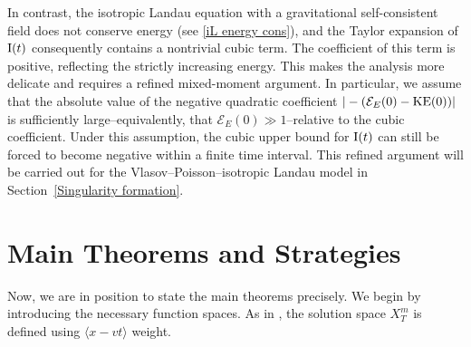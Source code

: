 \documentclass[reqno,11pt,final]{amsart}
\theoremstyle{plain}
\numberwithin{equation}{section}
\numberwithin{theorem}{section}
\begin{document}
In contrast, the isotropic Landau equation with a gravitational self-consistent field does not conserve energy (see
\eqref{iL energy cons}), and the Taylor expansion of $\textup{I}(t)$ consequently contains a nontrivial cubic term.  The coefficient of this term is positive, reflecting the strictly increasing energy. This makes the analysis more delicate and requires a refined mixed-moment argument. In particular, we assume that the absolute value of the negative quadratic coefficient $|-(\mathcal{E}_E(0) - \textup{KE}(0))|$ is sufficiently large--equivalently, that $\mathcal{E}_E(0)\gg1$--relative to the cubic coefficient. Under this assumption, the cubic upper bound for $\textup{I}(t)$ can still be forced to become negative within a finite time interval. This refined argument will be carried out for the Vlasov--Poisson--isotropic Landau model in Section~\ref{Singularity formation}.



\section{Main Theorems and Strategies}
Now, we are in position to state the main theorems precisely. We begin by introducing the necessary function spaces. As in \cite{IHL_Luk_2019, IHL_Sanchit_2020}, the solution space $X_T^m$ is defined using $\langle x-vt \rangle$ weight.
\end{document}
